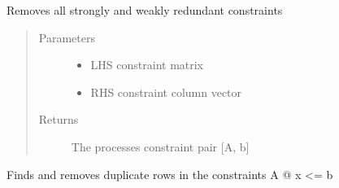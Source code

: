\documentclass[letterpaper,10pt,english]{sphinxmanual}
\begin{document}
\begin{fulllineitems}
\label{\detokenize{ppopt.utils:ppopt.utils.constraint_utilities.process_region_constraints}}
\sphinxAtStartPar
Removes all strongly and weakly redundant constraints
\begin{quote}\begin{description}
\item[{Parameters}] \leavevmode\begin{itemize}
\item {} 
\sphinxAtStartPar
{} \textendash{} LHS constraint matrix

\item {} 
\sphinxAtStartPar
{} \textendash{} RHS constraint column vector

\end{itemize}

\item[{Returns}] \leavevmode
\sphinxAtStartPar
The processes constraint pair {[}A, b{]}

\end{description}\end{quote}

\end{fulllineitems}


\begin{fulllineitems}
\label{\detokenize{ppopt.utils:ppopt.utils.constraint_utilities.remove_duplicate_rows}}
\sphinxAtStartPar
Finds and removes duplicate rows in the constraints A @ x \textless{}= b

\end{fulllineitems}
\end{document}
